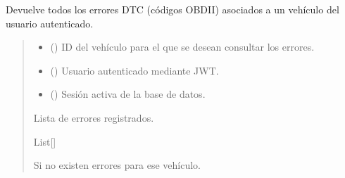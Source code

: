 \documentclass[letterpaper,10pt,spanish]{sphinxmanual}
\begin{document}

\begin{fulllineitems}
\label{\detokenize{endpoints:main.obtener_errores}}
\pysigstartsignatures
\pysiglinewithargsret
{}
{\sphinxparamcomma {}\sphinxparamcomma {}}
{}
\pysigstopsignatures
\sphinxAtStartPar
Devuelve todos los errores DTC (códigos OBD\sphinxhyphen{}II) asociados a un vehículo del usuario autenticado.
\begin{quote}\begin{description}
\begin{itemize}
\item {} 
\sphinxAtStartPar
{} () \textendash{} ID del vehículo para el que se desean consultar los errores.

\item {} 
\sphinxAtStartPar
{} ({\hyperref[\detokenize{modelos:main.Usuario}]{}}) \textendash{} Usuario autenticado mediante JWT.

\item {} 
\sphinxAtStartPar
{} () \textendash{} Sesión activa de la base de datos.

\end{itemize}

\sphinxAtStartPar
Lista de errores registrados.

\sphinxAtStartPar
List{[}{\hyperref[\detokenize{modelos:main.ErrorVehiculo}]{}}{]}

\sphinxAtStartPar
{} \textendash{} Si no existen errores para ese vehículo.

\end{description}\end{quote}

\end{fulllineitems}
\end{document}
